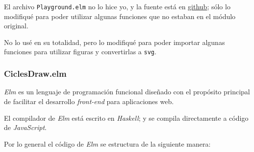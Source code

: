 \documentclass[12pt]{article}
\begin{document}
El archivo \texttt{Playground.elm} no lo hice yo, y la fuente está en \href{https://github.com/evancz/elm-playground/tree/master}{github}; sólo lo modifiqué para poder utilizar algunas funciones que no estaban en el módulo original.

No lo usé en su totalidad, pero lo modifiqué para poder importar algunas funciones para utilizar figuras y convertirlas a \texttt{svg}.

\subsubsection*{CiclesDraw.elm}

\textit{Elm} es un lenguaje de programación funcional diseñado con el propósito principal de facilitar el desarrollo \textit{front-end} para aplicaciones web.

El compilador de \textit{Elm} está escrito en \textit{Haskell}; y se compila directamente a código de \textit{JavaScript}.

Por lo general el código de \textit{Elm} se estructura de la siguiente manera:
\end{document}
